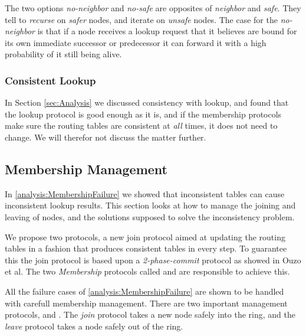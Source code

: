 The two options \emph{no-neighbor} and \emph{no-safe} are opposites of \emph{neighbor}
 and \emph{safe}. They tell to \emph{recurse} on \emph{safer} nodes, and iterate on
 \emph{unsafe} nodes. The case for the \emph{no-neighbor} is that if a node receives a
 lookup request that it believes are bound for its own immediate successor or predecessor
 it can forward it with a high probability of it still being alive.

\subsubsection{Consistent Lookup}
\label{design:consistency-in-lookup}

In Section \ref{sec:Analysis} we discussed consistency with lookup, and found that the
 lookup protocol is good enough as it is, and if the membership protocols make sure the
 routing tables are consistent at \emph{all} times, it does not need to change. We will
 therefor not discuss the matter further.





\subsection{Membership Management}
\label{design:membership}
\label{design:mm-protocols}


In \ref{analysis:MembershipFailure} we showed that inconsistent tables can
 cause inconsistent lookup results. This section looks at how to manage the joining and
 leaving of nodes, and the solutions supposed to solve the inconsistency problem.

We propose two protocols, a new join protocol aimed at updating the routing tables
 in a fashion that produces consistent tables in every step. To guarantee this
 the join protocol is based upon a \emph{2-phase-commit} protocol as showed in
 Ouzo et al\cite{oszu-99-podds}. %
 The two \emph{Membership} protocols called  and  are
 responsible to achieve this.

All the failure cases of \ref{analysis:MembershipFailure} are shown to be handled
 with carefull membership management. There are two important management protocols,
  and . The \emph{join} protocol takes a new node safely into the ring,
 and the \emph{leave} protocol takes a node safely out of the ring.

